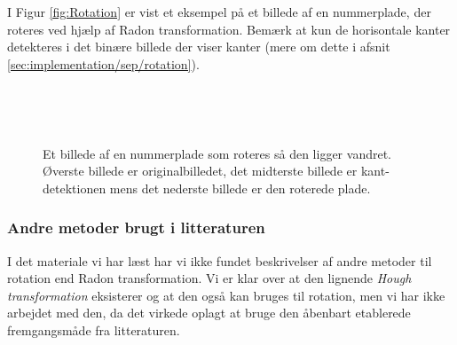I Figur \vref{fig:Rotation} er vist et eksempel på et billede af en nummerplade, der roteres ved hjælp af Radon transformation. Bemærk at kun de horisontale kanter detekteres i det binære billede der viser kanter (mere om dette i afsnit \vref{sec:implementation/sep/rotation}).

\begin{figure}[htp]
  \centering
  \begin{minipage}[c]{6 cm}
  \end{minipage}\\
  \begin{minipage}[c]{6 cm}
  \end{minipage}\\
  \begin{minipage}[c]{6 cm}
  \end{minipage}
  \caption{Et billede af en nummerplade som roteres så den ligger vandret. Øverste billede er originalbilledet, det midterste billede er kant-detektionen mens det nederste billede er den roterede plade.}
  \label{fig:Rotation}
\end{figure}


\subsubsection*{Andre metoder brugt i litteraturen}
I det materiale vi har læst har vi ikke fundet beskrivelser af andre metoder til rotation end Radon transformation. Vi er klar over at den lignende \textit{Hough transformation} eksisterer og at den også kan bruges til rotation, men vi har ikke arbejdet med den, da det virkede oplagt at bruge den åbenbart etablerede fremgangsmåde fra litteraturen. 

